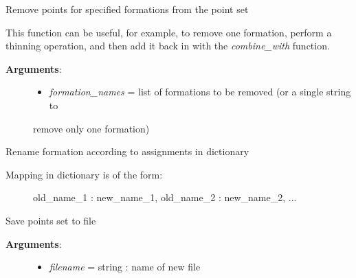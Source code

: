 \documentclass[letterpaper,10pt,english]{sphinxmanual}
\begin{document}
\begin{fulllineitems}

\begin{fulllineitems}
\label{pygeomod:pygeomod.struct_data.Struct3DPoints.remove_formations}
Remove points for specified formations from the point set

This function can be useful, for example, to remove one formation, perform
a thinning operation, and then add it back in with the \emph{combine\_with} function.
\begin{description}
\item[{\textbf{Arguments}:}] \leavevmode\begin{itemize}
\item {} 
\emph{formation\_names} = list of formations to be removed (or a single string to

\end{itemize}

remove only one formation)

\end{description}

\end{fulllineitems}


\begin{fulllineitems}
\label{pygeomod:pygeomod.struct_data.Struct3DPoints.rename_formations}
Rename formation according to assignments in dictionary
\begin{description}
\item[{Mapping in dictionary is of the form:}] \leavevmode
old\_name\_1 : new\_name\_1, old\_name\_2 : new\_name\_2, ...

\end{description}

\end{fulllineitems}


\begin{fulllineitems}
\label{pygeomod:pygeomod.struct_data.Struct3DPoints.save}
Save points set to file
\begin{description}
\item[{\textbf{Arguments}:}] \leavevmode\begin{itemize}
\item {} 
\emph{filename} = string : name of new file


\end{itemize}
\end{description}
\end{fulllineitems}
\end{fulllineitems}
\end{document}
